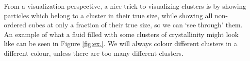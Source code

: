 \documentclass[thesis]{subfiles}
\begin{document}
From a visualization perspective, a nice trick to visualizing clusters is by showing particles which belong to a cluster in their true size, while showing all non-ordered cubes at only a fraction of their true size, so we can `see through' them. An example of what a fluid filled with some clusters of crystallinity might look like can be seen in Figure \ref{fig:ex.}. We will always colour different clusters in a different colour, unless there are too many different clusters.

%
\end{document}
